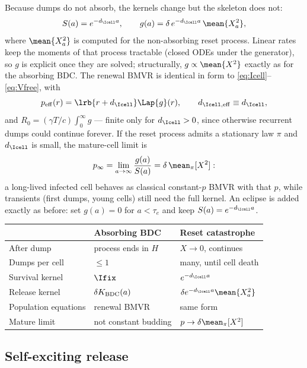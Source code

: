 Because dumps do not absorb, the kernels change but the skeleton does not:
\begin{equation}
S(a)=e^{-d_{\Icell}a},
\qquad
g(a)=\delta\,e^{-d_{\Icell}a}\,\mean{X_a^2},
\end{equation}
where $\mean{X_a^2}$ is computed for the non-absorbing reset process.
Linear rates keep the moments of that process tractable (closed ODEs under
the generator), so $g$ is explicit once they are solved; structurally,
$g\propto\mean{X^2}$ exactly as for the absorbing BDC. The renewal BMVR is
identical in form to \eqref{eq:Icell}--\eqref{eq:Vfree}, with
\begin{equation}
p_{\rm eff}(r)=\lrb{r+d_{\Icell}}\Lap{g}(r),
\qquad
d_{\Icell,{\rm eff}}\equiv d_{\Icell},
\end{equation}
and $R_0=(\gamma T/c)\int_0^\infty g$ --- finite only for $d_{\Icell}>0$,
since otherwise recurrent dumps could continue forever. If the reset process
admits a stationary law $\pi$ and $d_{\Icell}$ is small, the mature-cell
limit is
\begin{equation}
p_\infty=\lim_{a\to\infty}\frac{g(a)}{S(a)}=\delta\,\mean_\pi[X^2]:
\end{equation}
a long-lived infected cell behaves as classical constant-$p$ BMVR with that
$p$, while transients (first dumps, young cells) still need the full kernel.
An eclipse is added exactly as before: set $g(a)=0$ for $a<\tau_e$ and keep
$S(a)=e^{-d_{\Icell}a}$.

\begin{center}
\renewcommand{\arraystretch}{1.2}
\small
\begin{tabular}{@{}lll@{}}
\toprule
 & Absorbing BDC & Reset catastrophe \\
\midrule
After dump & process ends in $H$ & $X\to0$, continues \\
Dumps per cell & $\le1$ & many, until cell death \\
Survival kernel & $\Ifix$ & $e^{-d_{\Icell}a}$ \\
Release kernel & $\delta K_{\rm BDC}(a)$ & $\delta e^{-d_{\Icell}a}\mean{X_a^2}$ \\
Population equations & renewal BMVR & same form \\
Mature limit & not constant budding & $p\to\delta\mean_\pi[X^2]$ \\
\bottomrule
\end{tabular}
\end{center}

\subsection{Self-exciting release}
\label{sec:self-excite}

